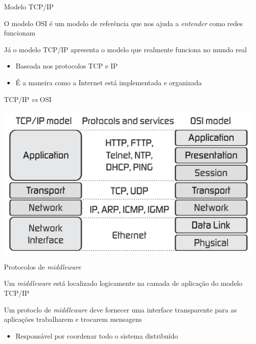 \documentclass[compress]{beamer}
\begin{document}

\begin{frame}{Modelo TCP/IP}

O modelo OSI é um modelo de referência que nos ajuda a \textit{entender} como redes funcionam

\vspace{1cm}

Já o modelo TCP/IP apresenta o modelo que realmente funciona no mundo real
\begin{itemize}
    \item Baseada nos protocolos TCP e IP
    \item É a maneira como a Internet está implementada e organizada
\end{itemize}

\end{frame}


\begin{frame}{TCP/IP \textit{vs} OSI}

\vspace{0.5cm}

\centering \includegraphics[width=\textwidth]{images/protocolos.png}

\end{frame}


\begin{frame}{Protocolos de \textit{middleware}}

Um \textit{middleware} está localizado logicamente na camada de aplicação do modelo TCP/IP


Um protoclo de \textit{middleware} deve fornecer uma interface transparente para as aplicações trabalharem e trocarem mensagens
\begin{itemize}
    \item Responsável por coordenar todo o sistema distribuído
\end{itemize}

\end{frame}
\end{document}
